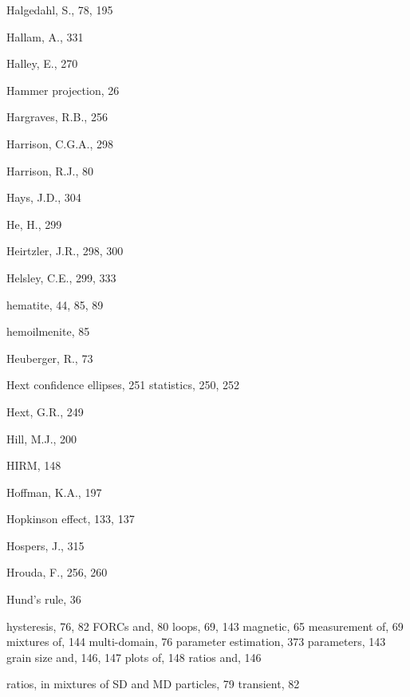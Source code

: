 \documentclass[,plain]{tauxe}
\begin{document}
\begin{theindex}
  \indexspace

  \item Halgedahl, S., 78, 195
  \item Hallam, A., 331
  \item Halley, E., 270
  \item Hammer projection, 26
  \item Hargraves, R.B., 256
  \item Harrison, C.G.A., 298
  \item Harrison, R.J., 80
  \item Hays, J.D., 304
  \item He, H., 299
  \item Heirtzler, J.R., 298, 300
  \item Helsley, C.E., 299, 333
  \item hematite, 44, 85, 89
  \item hemoilmenite, 85
  \item Heuberger, R., 73
  \item Hext
    \subitem confidence ellipses, 251
    \subitem statistics, 250, 252
  \item Hext, G.R., 249
  \item Hill, M.J., 200
  \item HIRM, 148
  \item Hoffman, K.A., 197
  \item Hopkinson effect, 133, 137
  \item Hospers, J., 315
  \item Hrouda, F., 256, 260
  \item Hund's rule, 36
  \item hysteresis, 76, 82
    \subitem FORCs and, 80
    	\subitem loops, 69, 143
	\subitem magnetic, 65
	\subitem measurement of, 69
	\subitem mixtures of, 144
    \subitem multi-domain, 76
    \subitem parameter estimation, 373
	\subitem parameters, 143
	\subsubitem grain size and, 146, 147
	\subsubitem plots of, 148    
	\subsubitem ratios and, 146
        
    \subitem ratios, in mixtures of SD and MD particles, 79
\subitem transient, 82
  \indexspace


\end{theindex}
\end{document}
